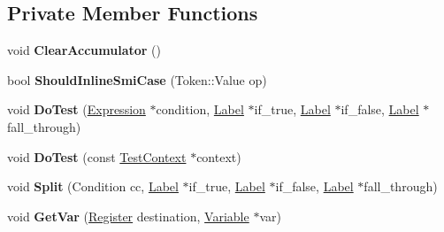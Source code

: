\subsection*{Private Member Functions}
\begin{DoxyCompactItemize}
\item 
void {\bfseries Clear\+Accumulator} ()\hypertarget{classv8_1_1internal_1_1_full_code_generator_a311b408ff5f7849594abe5f6deb66860}{}\label{classv8_1_1internal_1_1_full_code_generator_a311b408ff5f7849594abe5f6deb66860}

\item 
bool {\bfseries Should\+Inline\+Smi\+Case} (Token\+::\+Value op)\hypertarget{classv8_1_1internal_1_1_full_code_generator_aec5455296217ae0ed626600e0024dda1}{}\label{classv8_1_1internal_1_1_full_code_generator_aec5455296217ae0ed626600e0024dda1}

\item 
void {\bfseries Do\+Test} (\hyperlink{classv8_1_1internal_1_1_expression}{Expression} $\ast$condition, \hyperlink{classv8_1_1internal_1_1_label}{Label} $\ast$if\+\_\+true, \hyperlink{classv8_1_1internal_1_1_label}{Label} $\ast$if\+\_\+false, \hyperlink{classv8_1_1internal_1_1_label}{Label} $\ast$fall\+\_\+through)\hypertarget{classv8_1_1internal_1_1_full_code_generator_a8143d5813c6fe3296172beca9155c366}{}\label{classv8_1_1internal_1_1_full_code_generator_a8143d5813c6fe3296172beca9155c366}

\item 
void {\bfseries Do\+Test} (const \hyperlink{classv8_1_1internal_1_1_full_code_generator_1_1_test_context}{Test\+Context} $\ast$context)\hypertarget{classv8_1_1internal_1_1_full_code_generator_a73aae3a19aa6ce7bec1949605c9f7cfd}{}\label{classv8_1_1internal_1_1_full_code_generator_a73aae3a19aa6ce7bec1949605c9f7cfd}

\item 
void {\bfseries Split} (Condition cc, \hyperlink{classv8_1_1internal_1_1_label}{Label} $\ast$if\+\_\+true, \hyperlink{classv8_1_1internal_1_1_label}{Label} $\ast$if\+\_\+false, \hyperlink{classv8_1_1internal_1_1_label}{Label} $\ast$fall\+\_\+through)\hypertarget{classv8_1_1internal_1_1_full_code_generator_a111d13043ac3a604c25840d38866ada6}{}\label{classv8_1_1internal_1_1_full_code_generator_a111d13043ac3a604c25840d38866ada6}

\item 
void {\bfseries Get\+Var} (\hyperlink{structv8_1_1internal_1_1_register}{Register} destination, \hyperlink{classv8_1_1internal_1_1_variable}{Variable} $\ast$var)\hypertarget{classv8_1_1internal_1_1_full_code_generator_a1bdb1331e17b204dce752da431884c0a}{}\label{classv8_1_1internal_1_1_full_code_generator_a1bdb1331e17b204dce752da431884c0a}


\end{DoxyCompactItemize}
